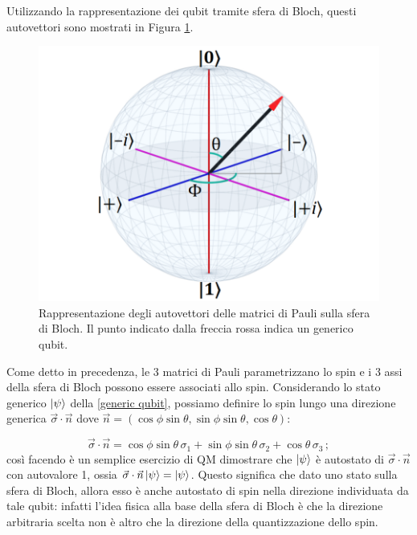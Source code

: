 \noindent Utilizzando la rappresentazione dei qubit tramite sfera di Bloch, questi autovettori sono mostrati in Figura \ref{fig:BlochSphere2}. 

\begin{figure}[!ht]
    \centering
    \includegraphics[scale=0.6]{images/bloch-hdr-440.png}
    \caption{Rappresentazione degli autovettori delle matrici di Pauli sulla sfera di Bloch. Il punto indicato dalla freccia rossa indica un generico qubit.}
    \label{fig:BlochSphere2}
\end{figure}

\noindent Come detto in precedenza, le 3 matrici di Pauli parametrizzano lo spin e i 3 assi della sfera di Bloch possono essere associati allo spin. Considerando lo stato generico $\ket{\psi}$ della \eqref{generic qubit}, possiamo definire lo spin lungo una direzione generica $\vec{\sigma} \cdot \vec{n}$ dove $\vec n = (\cos\phi\sin\theta, \sin\phi\sin\theta, \cos\theta)$:

\begin{equation*}
    \vec{\sigma} \cdot \vec n = \cos\phi\sin\theta \, \sigma_1 + \sin \phi \sin \theta \, \sigma_2 + \cos \theta \, \sigma_3 \, ;
\end{equation*}
così facendo è un semplice esercizio di QM dimostrare che $\ket{\psi}$ è autostato di $\vec{\sigma} \cdot \vec n$ con autovalore 1, ossia $\vec{\sigma} \cdot \vec n \ket{\psi} = \ket{\psi}$. Questo significa che dato uno stato sulla sfera di Bloch, allora esso è anche autostato di spin nella direzione individuata da tale qubit: infatti l'idea fisica alla base della sfera di Bloch è che la direzione arbitraria scelta non è altro che la direzione della quantizzazione dello spin. 


